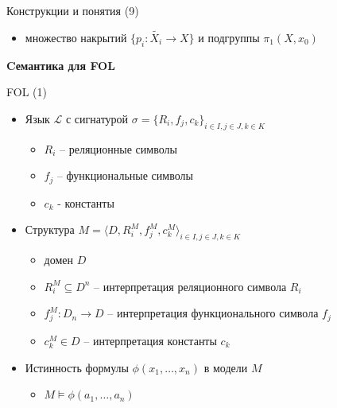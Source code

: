 \documentclass{beamer}
\begin{document}
\begin{frame}{Конструкции и понятия (9)}
\begin{itemize}
	\item множество накрытий $\{ p_i : \widetilde{X_i} \to X \}$ и подгруппы $\pi_1(X, x_0)$
\end{itemize}
\end{frame}



\begin{frame}{}
\begin{center}
	\textbf{Cемантика для FOL}
\end{center}
\end{frame}

\begin{frame}{FOL (1)}
\begin{itemize}
	\item Язык $\mathcal{L}$ с сигнатурой $\sigma = \{ R_i, f_j, c_k \}_{i \in I, j \in J, k \in K}$
		\medskip
		\begin{itemize}
			\item $R_i$ -- реляционные символы
			\item $f_j$ -- функциональные символы
			\item $c_k$ - константы
		\end{itemize}
	\bigskip
	\item Структура $M = \langle D, R_i^M, f_j^M, c_k^M \rangle_{i \in I, j \in J, k \in K}$
		\medskip
		\begin{itemize}
			\item домен $D$ 
			\item $R_i^M \subseteq D^n$ -- интерпретация реляционного символа $R_i$
			\item $f_j^M : D_n \to D$ -- интерпретация функционального символа $f_j$
			\item $c_k^M \in D$ -- интерпретация константы $c_k$
		\end{itemize}
	\bigskip
	\item Истинность формулы $\phi(x_1, \dots, x_n)$ в модели $M$
		\medskip
		\begin{itemize}
			\item $M \models \phi(a_1, \dots, a_n)$
		\end{itemize}
\end{itemize}
\end{frame}
\end{document}
